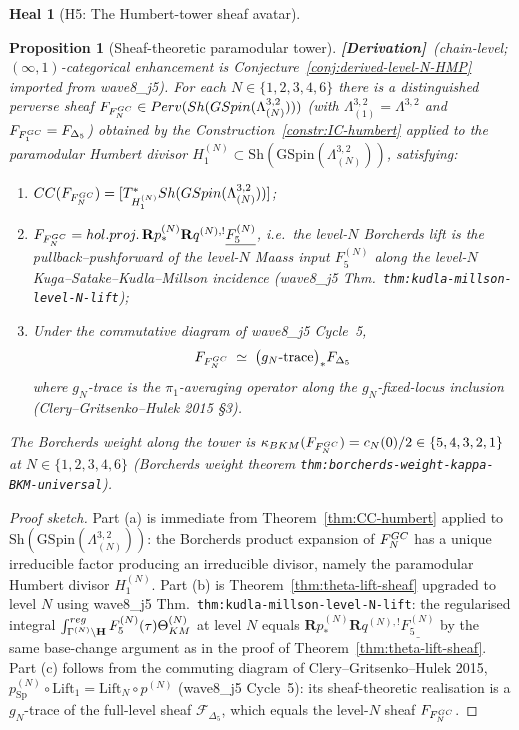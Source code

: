 \documentclass[11pt]{amsart}
\newtheorem{proposition}[theorem]{Proposition}
\theoremstyle{definition}
\newtheorem{heal}[attack]{Heal}
\providecommand{\kBKM}{\kappa_{\mathrm{BKM}}}
\providecommand{\Perv}{\mathrm{Perv}}
\providecommand{\Sh}{\mathrm{Sh}}
\providecommand{\GSpin}{\mathrm{GSpin}}
\providecommand{\Sp}{\mathrm{Sp}}
\providecommand{\cF}{\mathcal{F}}
\providecommand{\bR}{\mathbf{R}}
\providecommand{\bH}{\mathbf{H}}
\providecommand{\holproj}{\mathrm{hol.proj.}}
\providecommand{\Dfive}{\Delta_5}
\providecommand{\CharCyc}{\mathrm{CC}}
\providecommand{\ClaimStatusDerivation}{\textbf{[Derivation]}}
\begin{document}
\begin{heal}[H5: The Humbert-tower sheaf avatar]\leavevmode

\begin{proposition}[Sheaf-theoretic paramodular tower]
\label{prop:paramodular-tower-sheaves}
\ClaimStatusDerivation\ (chain-level; $(\infty,1)$-categorical
enhancement is Conjecture~\ref{conj:derived-level-N-HMP} imported
from wave8\_j5).
For each $N \in \{1, 2, 3, 4, 6\}$ there is a distinguished perverse
sheaf $\cF_{F^{\rm GC}_N} \in \Perv(\Sh(\GSpin(\Lambda^{3,2}_{(N)})))$
(with $\Lambda^{3,2}_{(1)} = \Lambda^{3,2}$ and
$\cF_{F^{\rm GC}_1} = \cF_{\Dfive}$) obtained by the
Construction~\ref{constr:IC-humbert} applied to the paramodular
Humbert divisor $H_1^{(N)} \subset
\Sh(\GSpin(\Lambda^{3,2}_{(N)}))$, satisfying:
\begin{enumerate}[label=(\alph*)]
\item $\CharCyc(\cF_{F^{\rm GC}_N}) = [T^*_{H_1^{(N)}}
\Sh(\GSpin(\Lambda^{3,2}_{(N)}))]$;
\item $\cF_{F^{\rm GC}_N} = \holproj\, \bR p^{(N)}_* \bR q^{(N),!}
\underline{F^{(N)}_5}$, i.e.\ the level-$N$ Borcherds lift is the
pullback--pushforward of the level-$N$ Maass input $F^{(N)}_5$ along
the level-$N$ Kuga--Satake--Kudla--Millson incidence (wave8\_j5
Thm.~\texttt{thm:kudla-millson-level-N-lift});
\item Under the commutative diagram of wave8\_j5 Cycle~5,
\[
 \cF_{F^{\rm GC}_N} \;\simeq\;
 \bigl(g_N\text{-trace}\bigr)_* \cF_{\Dfive}
\]
where $g_N$-trace is the $\pi_1$-averaging operator along the
$g_N$-fixed-locus inclusion (Clery--Gritsenko--Hulek 2015 \S 3).
\end{enumerate}
The Borcherds weight along the tower is
$\kBKM(\cF_{F^{\rm GC}_N}) = c_N(0)/2 \in \{5, 4, 3, 2, 1\}$ at
$N \in \{1, 2, 3, 4, 6\}$ (Borcherds weight theorem
\texttt{thm:borcherds-weight-kappa-BKM-universal}).
\end{proposition}

\begin{proof}[Proof sketch]
Part (a) is immediate from Theorem~\ref{thm:CC-humbert} applied to
$\Sh(\GSpin(\Lambda^{3,2}_{(N)}))$: the Borcherds product expansion
of $F^{\rm GC}_N$ has a unique irreducible factor producing an
irreducible divisor, namely the paramodular Humbert divisor
$H_1^{(N)}$. Part (b) is Theorem~\ref{thm:theta-lift-sheaf} upgraded
to level $N$ using wave8\_j5 Thm.~\texttt{thm:kudla-millson-level-N-lift}:
the regularised integral
$\int^{\rm reg}_{\Gamma^{(N)}\backslash \bH} F^{(N)}_5(\tau)
\Theta^{(N)}_{\rm KM}$ at level $N$ equals
$\bR p^{(N)}_* \bR q^{(N), !} \underline{F^{(N)}_5}$ by the same
base-change argument as in the proof of
Theorem~\ref{thm:theta-lift-sheaf}. Part (c) follows from the commuting
diagram of Clery--Gritsenko--Hulek 2015, $p^{(N)}_{\Sp} \circ
\mathrm{Lift}_1 = \mathrm{Lift}_N \circ p^{(N)}$ (wave8\_j5 Cycle~5):
its sheaf-theoretic realisation is a $g_N$-trace of the full-level
sheaf $\cF_{\Dfive}$, which equals the level-$N$ sheaf
$\cF_{F^{\rm GC}_N}$.
\end{proof}


\end{heal}
\end{document}
